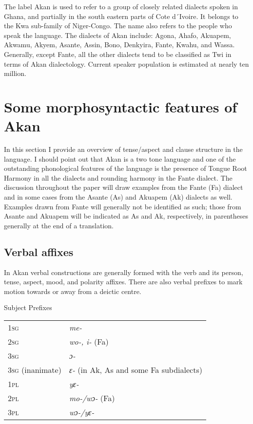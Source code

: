 \documentclass[output=paper]{langsci/langscibook}
\begin{document}
The label Akan is used to refer to a group of closely related dialects spoken in Ghana, and partially in the south eastern parts of Cote d´Ivoire. It belongs to the Kwa sub-family of Niger-Congo. The name also refers to the people who speak the language. The dialects of Akan include: Agona, Ahafo, Akuapem, Akwamu, Akyem, Asante, Assin, Bono, Denkyira, Fante, Kwahu, and Wassa. Generally, except Fante, all the other dialects tend to be classified as Twi in terms of Akan dialectology. Current speaker population is estimated at nearly ten million.

\section{Some morphosyntactic features of Akan}\label{§2:morphosyntactic.osam}

In this section I provide an overview of tense/aspect and clause structure in the language. I should point out that Akan is a two tone language and one of the outstanding phonological features of the language is the presence of Tongue Root Harmony in all the dialects and rounding harmony in the Fante dialect. The discussion throughout the paper will draw examples from the Fante (Fa) dialect and in some cases from the Asante (As) and Akuapem (Ak) dialects as well. Examples drawn from Fante will generally not be identified as such; those from Asante and Akuapem will be indicated as As and Ak, respectively, in parentheses generally at the end of a translation.

\subsection{Verbal affixes}\label{§2.1:verbal.osam}

In Akan verbal constructions are generally formed with the verb and its person, tense, aspect, mood, and polarity affixes. There are also verbal prefixes to mark motion towards or away from a deictic centre.

\ea
\label{ex:1.osam}
Subject Prefixes \\
\begin{table}
\begin{tabular}{ll}
     \textsc{1sg} & \textit{me-}\\
     \textsc{2sg} & \textit{wo-, i-} (Fa)\\
     \textsc{3sg} & \textit{ɔ-}\\
     \textsc{3sg} (inanimate) & \textit{ɛ-} (in Ak, As and some Fa subdialects)\\
     \textsc{1pl} & \textit{yɛ-}\\
     \textsc{2pl} & \textit{mo-/wɔ-} (Fa)\\
     \textsc{3pl} & \textit{wɔ-/yɛ-}\\
\end{tabular}
\end{table}
\z
\end{document}
